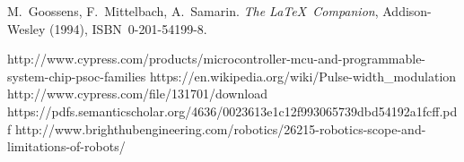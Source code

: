 \documentclass[letterpaper,12pt]{article}
\begin{document}
\begin{thebibliography}{9}
\footnotesize
\setlength{\itemsep}{0pt}
M.~Goossens, F.~Mittelbach, A.~Samarin. \emph{The \LaTeX\ Companion},
Addison-Wesley (1994), ISBN~0-201-54199-8.

\bibitem{}
http://www.cypress.com/products/microcontroller-mcu-and-programmable-system-chip-psoc-families
\bibitem{}
https://en.wikipedia.org/wiki/Pulse-width\_modulation
\bibitem{}
http://www.cypress.com/file/131701/download
\bibitem{}
https://pdfs.semanticscholar.org/4636/0023613e1c12f993065739dbd54192a1fcff.pdf
\bibitem{}
http://www.brighthubengineering.com/robotics/26215-robotics-scope-and-limitations-of-robots/

\end{thebibliography}
\end{document}
